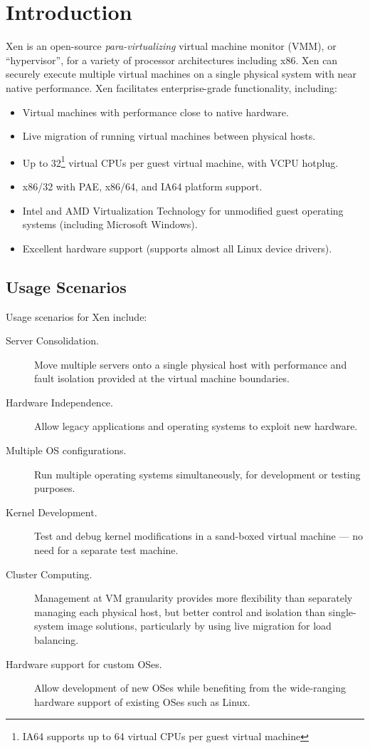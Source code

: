 \documentclass[11pt,twoside,final,openright]{report}
\begin{document}
\chapter{Introduction}


Xen is an open-source \emph{para-virtualizing} virtual machine monitor
(VMM), or ``hypervisor'', for a variety of processor architectures including x86. Xen can securely execute multiple virtual machines on a single physical system with near native performance.  Xen facilitates enterprise-grade functionality, including:

\begin{itemize}
\item Virtual machines with performance close to native hardware.
\item Live migration of running virtual machines between physical hosts.
\item Up to 32\footnote{IA64 supports up to 64 virtual CPUs per guest virtual machine} virtual CPUs per guest virtual machine, with VCPU hotplug.
\item x86/32 with PAE, x86/64, and IA64 platform support.
\item Intel and AMD Virtualization Technology for unmodified guest operating systems (including Microsoft Windows).
\item Excellent hardware support (supports almost all Linux device
  drivers). 
\end{itemize}


\section{Usage Scenarios}

Usage scenarios for Xen include:

\begin{description}
\item [Server Consolidation.] Move multiple servers onto a single
  physical host with performance and fault isolation provided at the
  virtual machine boundaries.
\item [Hardware Independence.] Allow legacy applications and operating 
  systems to exploit new hardware.
\item [Multiple OS configurations.] Run multiple operating systems
  simultaneously, for development or testing purposes.
\item [Kernel Development.] Test and debug kernel modifications in a
  sand-boxed virtual machine --- no need for a separate test machine.
\item [Cluster Computing.] Management at VM granularity provides more
  flexibility than separately managing each physical host, but better
  control and isolation than single-system image solutions,
  particularly by using live migration for load balancing.
\item [Hardware support for custom OSes.] Allow development of new
  OSes while benefiting from the wide-ranging hardware support of
  existing OSes such as Linux.
\end{description}
\end{document}
